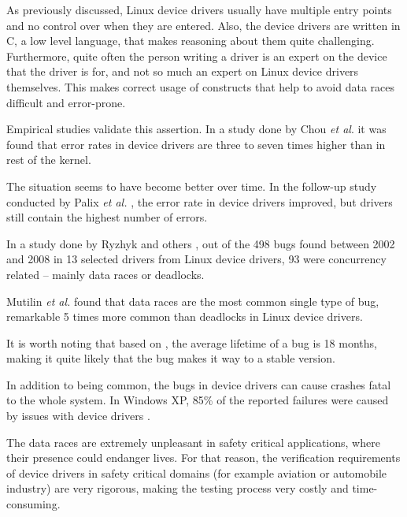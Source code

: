 \documentclass[..thesis.tex]{subfiles}
\begin{document}
As previously discussed, Linux device drivers usually have multiple entry points and no control over when they are entered. Also, the device drivers are written in C, a low level language, that makes reasoning about them quite challenging. Furthermore, quite often the person writing a driver is an expert on the device that the driver is for, and not so much an expert on Linux device drivers themselves. This makes correct usage of constructs that help to avoid data races difficult and error-prone.




Empirical studies validate this assertion. In a study done by Chou \textit{et al}. \cite{chou_empirical_2001} it was found that error rates in device drivers are three to seven times higher than in rest of the kernel. 

The situation seems to have become better over time. In the follow-up study conducted by Palix \textit{et al.} \cite{palix_faults_2011}, the error rate in device drivers improved, but drivers still contain the highest number of errors.

In a study done by Ryzhyk and others \cite{ryzhyk_dingo_2009}, out of the 498 bugs found between 2002 and 2008 in 13 selected drivers from Linux device drivers, 93 were concurrency related -- mainly data races or deadlocks. 

Mutilin \textit{et al.} \cite{mutilin_analysis_2012} found that data races are the most common single type of bug, remarkable 5 times more common than deadlocks in Linux device drivers.

It is worth noting that based on \cite{chou_empirical_2001,palix_faults_2011}, the average lifetime of a bug is 18 months, making it quite likely that the bug makes it way to a stable version. 


In addition to being common, the bugs in device drivers can cause crashes fatal to the whole system. In Windows XP, 85\% of the reported failures were caused by issues with device drivers \cite{swift_improving_2003}.

The data races are extremely unpleasant in safety critical applications, where their presence could endanger lives. For that reason, the verification requirements of device drivers in safety critical domains (for example aviation or automobile industry) are very rigorous, making the testing process very costly and time-consuming.
\end{document}
